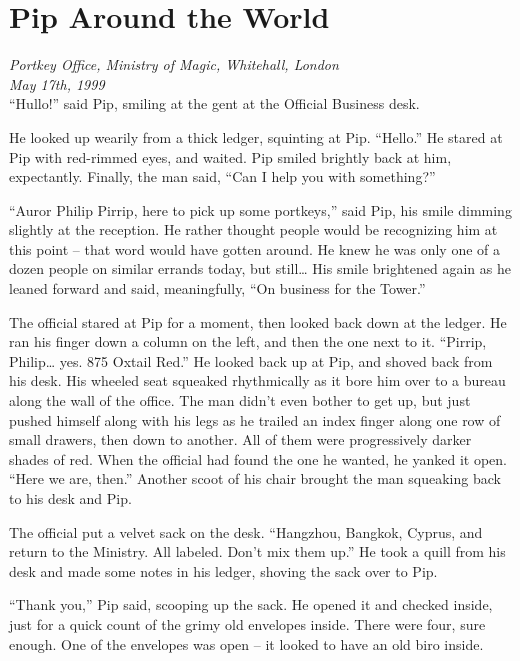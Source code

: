 \hypertarget{pip-around-the-world}{%
\chapter{Pip Around the World}\label{pip-around-the-world}}

\emph{Portkey Office, Ministry of Magic, Whitehall, London\\
May 17th, 1999}\\

``Hullo!'' said Pip, smiling at the gent at the Official Business desk.

He looked up wearily from a thick ledger, squinting at Pip. ``Hello.''
He stared at Pip with red-rimmed eyes, and waited. Pip smiled brightly
back at him, expectantly. Finally, the man said, ``Can I help you with
something?''

``Auror Philip Pirrip, here to pick up some portkeys,'' said Pip, his
smile dimming slightly at the reception. He rather thought people would
be recognizing him at this point -- that word would have gotten around.
He knew he was only one of a dozen people on similar errands today, but
still\ldots{} His smile brightened again as he leaned forward and said,
meaningfully, ``On business for the Tower.''

The official stared at Pip for a moment, then looked back down at the
ledger. He ran his finger down a column on the left, and then the one
next to it. ``Pirrip, Philip\ldots{} yes. 875 Oxtail Red.'' He looked
back up at Pip, and shoved back from his desk. His wheeled seat squeaked
rhythmically as it bore him over to a bureau along the wall of the
office. The man didn't even bother to get up, but just pushed himself
along with his legs as he trailed an index finger along one row of small
drawers, then down to another. All of them were progressively darker
shades of red. When the official had found the one he wanted, he yanked
it open. ``Here we are, then.'' Another scoot of his chair brought the
man squeaking back to his desk and Pip.

The official put a velvet sack on the desk. ``Hangzhou, Bangkok, Cyprus,
and return to the Ministry. All labeled. Don't mix them up.'' He took a
quill from his desk and made some notes in his ledger, shoving the sack
over to Pip.

``Thank you,'' Pip said, scooping up the sack. He opened it and checked
inside, just for a quick count of the grimy old envelopes inside. There
were four, sure enough. One of the envelopes was open -- it looked to
have an old biro inside.

